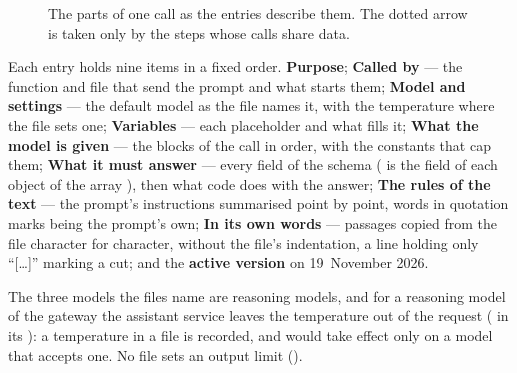\begin{figure}[H]
\centering
{}
\actorlegend
\caption{The parts of one call as the entries describe them. The dotted arrow is taken only
by the steps whose calls share data.}\label{fig:aprompts:call}
\end{figure}

Each entry holds nine items in a fixed order. \textbf{Purpose}; \textbf{Called by} --- the
function and file that send the prompt and what starts them; \textbf{Model and settings} ---
the default model as the file names it, with the temperature where the file sets one;
\textbf{Variables} --- each placeholder and what fills it; \textbf{What the model is given}
--- the blocks of the call in order, with the constants that cap them; \textbf{What it must
answer} --- every field of the schema ( is the field  of
each object of the array ), then what code does with the answer;
\textbf{The rules of the text} --- the prompt's instructions summarised point by point, words in
quotation marks being the prompt's own; \textbf{In its own words} --- passages copied from the
file character for character, without the file's indentation, a line holding only
\enquote{[…]} marking a cut; and the \textbf{active version} on 19~November 2026.

The three models the files name are reasoning models, and for a reasoning model of the gateway
the assistant service leaves the temperature out of the request (
in its ): a temperature in a file is recorded, and would take effect only
on a model that accepts one. No file sets an output limit ().


